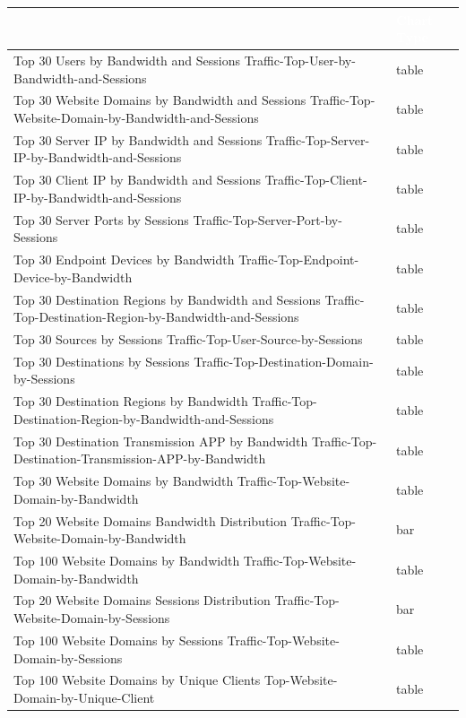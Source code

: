 \begin{longtable}{p{}|p{}}   
    \rowcolor{black}\multicolumn{1}{l!\vlinewhite}{\textcolor{white}{Name}}  & \textcolor{white}{Chart Type} \\\hline
    Top 30 Users by Bandwidth and Sessions Traffic-Top-User-by-Bandwidth-and-Sessions &	table \\\hline
    Top 30 Website Domains by Bandwidth and Sessions Traffic-Top-Website-Domain-by-Bandwidth-and-Sessions &	table \\\hline
    Top 30 Server IP by Bandwidth and Sessions Traffic-Top-Server-IP-by-Bandwidth-and-Sessions &	table \\\hline
    Top 30 Client IP by Bandwidth and Sessions Traffic-Top-Client-IP-by-Bandwidth-and-Sessions &	table \\\hline
    Top 30 Server Ports by Sessions Traffic-Top-Server-Port-by-Sessions &	table \\\hline
    Top 30 Endpoint Devices by Bandwidth Traffic-Top-Endpoint-Device-by-Bandwidth &	table \\\hline
    Top 30 Destination Regions by Bandwidth and Sessions Traffic-Top-Destination-Region-by-Bandwidth-and-Sessions &	table \\\hline
    Top 30 Sources by Sessions Traffic-Top-User-Source-by-Sessions &	table \\\hline
    Top 30 Destinations by Sessions Traffic-Top-Destination-Domain-by-Sessions &	table \\\hline
    Top 30 Destination Regions by Bandwidth Traffic-Top-Destination-Region-by-Bandwidth-and-Sessions &	table \\\hline
    Top 30 Destination Transmission APP by Bandwidth Traffic-Top-Destination-Transmission-APP-by-Bandwidth &	table \\\hline
    Top 30 Website Domains by Bandwidth Traffic-Top-Website-Domain-by-Bandwidth &	table \\\hline
    Top 20 Website Domains Bandwidth Distribution Traffic-Top-Website-Domain-by-Bandwidth &	bar \\\hline
    Top 100 Website Domains by Bandwidth Traffic-Top-Website-Domain-by-Bandwidth &	table \\\hline
    Top 20 Website Domains Sessions Distribution Traffic-Top-Website-Domain-by-Sessions &	bar \\\hline
    Top 100 Website Domains by Sessions Traffic-Top-Website-Domain-by-Sessions &	table \\\hline
    Top 100 Website Domains by Unique Clients Top-Website-Domain-by-Unique-Client &	table \\\hline

\end{longtable}
